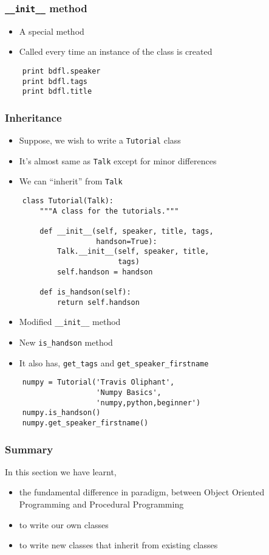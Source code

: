 \begin{frame}[fragile]
  \frametitle{\texttt{\_\_init\_\_} method}
  \begin{itemize}
  \item A special method 
  \item Called every time an instance of the class is created
  \end{itemize}
  \begin{lstlisting}
    print bdfl.speaker
    print bdfl.tags
    print bdfl.title
  \end{lstlisting}
\end{frame}

\begin{frame}
  \frametitle{Inheritance}
  \begin{itemize}
  \item Suppose, we wish to write a \texttt{Tutorial} class
  \item It's almost same as \texttt{Talk} except for minor differences
  \item We can ``inherit'' from \texttt{Talk}
  \end{itemize}
  \begin{lstlisting}
    class Tutorial(Talk):
        """A class for the tutorials."""

        def __init__(self, speaker, title, tags, 
                     handson=True):
            Talk.__init__(self, speaker, title, 
                          tags)
            self.handson = handson

        def is_handson(self):
            return self.handson
  \end{lstlisting}
  \begin{itemize}
  \item Modified \texttt{\_\_init\_\_} method
  \item New \texttt{is\_handson} method
  \item It also has, \texttt{get\_tags} and
    \texttt{get\_speaker\_firstname} 
  \end{itemize}
  \begin{lstlisting}
    numpy = Tutorial('Travis Oliphant', 
                     'Numpy Basics', 
                     'numpy,python,beginner')
    numpy.is_handson()
    numpy.get_speaker_firstname()
  \end{lstlisting}
\end{frame}

\begin{frame}[fragile]
  \frametitle{Summary}
  In this section we have learnt,
  \begin{itemize}
  \item the fundamental difference in paradigm, between Object Oriented
    Programming and Procedural Programming
  \item to write our own classes
  \item to write new classes that inherit from existing classes
  \end{itemize}
\end{frame}

